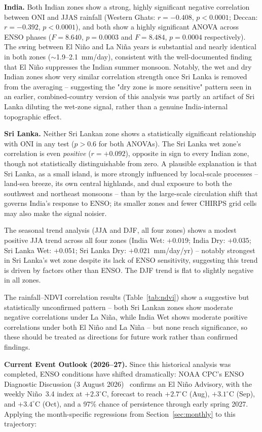 \documentclass{article}
\begin{document}
\textbf{India.} Both Indian zones show a strong, highly significant negative
correlation between ONI and JJAS rainfall (Western Ghats: $r=-0.408$, $p<0.0001$;
Deccan: $r=-0.392$, $p<0.0001$), and both show a highly significant ANOVA across ENSO
phases ($F=8.640$, $p=0.0003$ and $F=8.484$, $p=0.0004$ respectively). The swing
between El Ni\~{n}o and La Ni\~{n}a years is substantial and nearly identical in both
zones ($\sim$1.9--2.1~mm/day), consistent with the well-documented finding that El
Ni\~{n}o suppresses the Indian summer monsoon. Notably, the wet and dry Indian zones
show very similar correlation strength once Sri Lanka is removed from the averaging --
suggesting the "dry zone is more sensitive" pattern seen in an earlier, combined-country
version of this analysis was partly an artifact of Sri Lanka diluting the wet-zone
signal, rather than a genuine India-internal topographic effect.

\textbf{Sri Lanka.} Neither Sri Lankan zone shows a statistically significant
relationship with ONI in any test ($p>0.6$ for both ANOVAs). The Sri Lanka wet zone's
correlation is even \emph{positive} ($r=+0.092$), opposite in sign to every Indian
zone, though not statistically distinguishable from zero. A plausible explanation is
that Sri Lanka, as a small island, is more strongly influenced by local-scale processes
-- land-sea breeze, its own central highlands, and dual exposure to both the southwest
and northeast monsoons -- than by the large-scale circulation shift that governs
India's response to ENSO; its smaller zones and fewer CHIRPS grid cells may also make
the signal noisier.

The seasonal trend analysis (JJA and DJF, all four zones) shows a modest positive
JJA trend across all four zones (India Wet: $+0.019$; India Dry: $+0.035$; Sri Lanka
Wet: $+0.051$; Sri Lanka Dry: $+0.021$~mm/day/yr) -- notably strongest in Sri Lanka's
wet zone despite its lack of ENSO sensitivity, suggesting this trend is driven by
factors other than ENSO. The DJF trend is flat to slightly negative in all zones.

The rainfall--NDVI correlation results (Table~\ref{tab:ndvi}) show a suggestive but
statistically unconfirmed pattern -- both Sri Lankan zones show moderate negative
correlations under La Ni\~{n}a, while India Wet shows moderate positive correlations
under both El Ni\~{n}o and La Ni\~{n}a -- but none reach significance, so these should
be treated as directions for future work rather than confirmed findings.

\textbf{Current Event Outlook (2026--27).}
\label{sec:current_outlook}
Since this historical analysis was
completed, ENSO conditions have shifted dramatically: NOAA CPC's ENSO Diagnostic
Discussion (3 August 2026)~\cite{cpc_ensodisc_aug2026} confirms an El Ni\~{n}o
Advisory, with the weekly Ni\~{n}o~3.4 index at $+2.3^{\circ}$C, forecast to reach
$+2.7^{\circ}$C (Aug), $+3.1^{\circ}$C (Sep), and $+3.4^{\circ}$C (Oct), and a 97\%
chance of persistence through early spring 2027. Applying the month-specific
regressions from Section~\ref{sec:monthly} to this trajectory:
\end{document}
